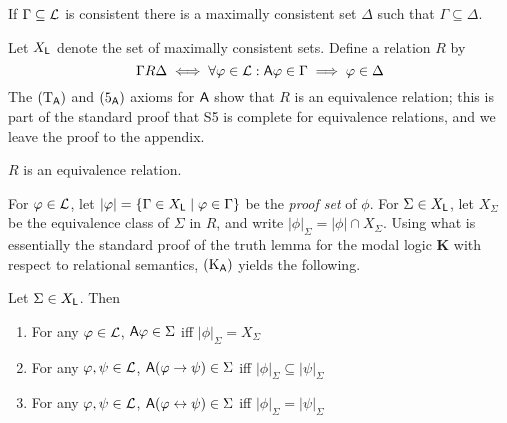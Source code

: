 

\begin{lemma}
\label{lemma_lindenbaum}
    If $\Gamma \subseteq \mathcal{L}$ is consistent there is a maximally consistent set
    $\Delta$ such that $\Gamma \subseteq \Delta$.
\end{lemma}

Let $X_{\mathsf{L}}$ denote the set of maximally consistent sets. Define a relation
$R$ by
\[
    \Gamma R \Delta
    \iff
    \forall \varphi \in \mathcal{L}:
     \mathsf{A}\varphi \in \Gamma \implies \varphi \in \Delta
\]
The $(\text{T}_{\mathsf{A}})$ and $(\text{5}_{\mathsf{A}})$ axioms for $\mathsf{A}$ show that $R$ is an equivalence
relation; this is part of the standard proof that S5 is complete for
equivalence relations, and we leave the proof to the appendix.

\begin{lemma}
\label{lemma_r_equiv_reln}
    $R$ is an equivalence relation.
\end{lemma}

For $\varphi \in \mathcal{L}$, let $|\varphi| = \{\Gamma \in X_{\mathsf{L}} \mid \varphi \in \Gamma\}$
be the \emph{proof set} of $\phi$. For $\Sigma \in X_{\mathsf{L}}$, let $X_\Sigma$ be
the equivalence class of $\Sigma$ in $R$, and write $|\phi|_\Sigma = |\phi|
\cap X_\Sigma$.
%
Using what is essentially the standard proof of the truth lemma for the modal
logic \textbf{K} with respect to relational semantics, $(\text{K}_{\mathsf{A}})$ yields the
following.

\begin{lemma}
\label{lemma_xsigma_properties}
    Let $\Sigma \in X_{\mathsf{L}}$. Then
    \begin{enumerate}\small
        \item\label{item_xsigma_mem} For any $\varphi \in \mathcal{L}$, $\mathsf{A}\varphi \in
            \Sigma$ iff $|\phi|_\Sigma = X_\Sigma$

        \item\label{item_xsigma_imp} For any $\varphi, \psi \in \mathcal{L}$, $\mathsf{A}(\varphi
            \to \psi) \in \Sigma$ iff $|\phi|_\Sigma \subseteq
            |\psi|_\Sigma$

        \item\label{item_xsigma_iff} For any $\varphi, \psi \in \mathcal{L}$, $\mathsf{A}(\varphi
            \leftrightarrow \psi) \in \Sigma$ iff $|\phi|_\Sigma = |\psi|_\Sigma$
    \end{enumerate}
\end{lemma}


